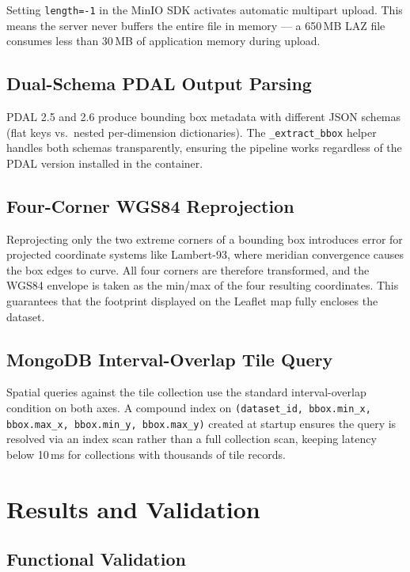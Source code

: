 Setting \texttt{length=-1} in the MinIO SDK activates automatic multipart upload. This means the server never buffers the entire file in memory — a 650\,MB LAZ file consumes less than 30\,MB of application memory during upload.

\subsection{Dual-Schema PDAL Output Parsing}

PDAL 2.5 and 2.6 produce bounding box metadata with different JSON schemas (flat keys vs.\ nested per-dimension dictionaries). The \texttt{\_extract\_bbox} helper handles both schemas transparently, ensuring the pipeline works regardless of the PDAL version installed in the container.

\subsection{Four-Corner WGS84 Reprojection}

Reprojecting only the two extreme corners of a bounding box introduces error for projected coordinate systems like Lambert-93, where meridian convergence causes the box edges to curve. All four corners are therefore transformed, and the WGS84 envelope is taken as the min/max of the four resulting coordinates. This guarantees that the footprint displayed on the Leaflet map fully encloses the dataset.

\subsection{MongoDB Interval-Overlap Tile Query}

Spatial queries against the tile collection use the standard interval-overlap condition on both axes. A compound index on \texttt{(dataset\_id, bbox.min\_x, bbox.max\_x, bbox.min\_y, bbox.max\_y)} created at startup ensures the query is resolved via an index scan rather than a full collection scan, keeping latency below 10\,ms for collections with thousands of tile records.

\section{Results and Validation}

\subsection{Functional Validation}


